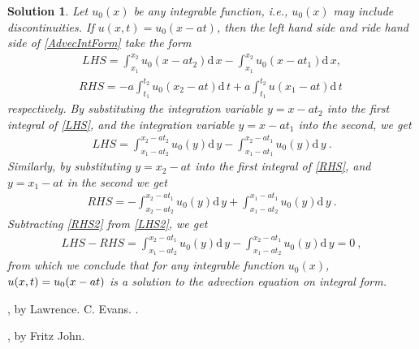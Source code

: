 \documentclass[10pt,letterpaper]{article}
\newcommand{\dif}[1][]{\mathrm{d} {#1}\,}
\newcommand{\frb}[1]{ \left(  {#1} \right) }
\theoremstyle{break}
\newtheorem{mysolution}{Solution}
\newenvironment{solution}{\begin{mysolution}}{\end{mysolution}}
\begin{document}
\begin{solution}
	Let $u_{0}(x)$ be any integrable function, i.e., $u_{0}(x)$ may include discontinuities. If $u(x,t)=u_0(x-at)$, then the left hand side and ride hand side of \eqref{AdvecIntForm} take the form
	\begin{gather} \label{LHS}
		LHS=\int_{x_{1}}^{x_{2}}u_{0}\frb{x-at_{2}}\dif x
				-\int_{x_{1}}^{x_{2}}u_{0}\frb{x-at_{1}} \dif x,
	\end{gather}
	\begin{gather} \label{RHS}
		RHS=-a\int_{t_{1}}^{t_{2}}u_{0}\frb{x_{2}-at}\dif t
				+a\int_{t_{1}}^{t_{2}}u\frb{x_{1}-at}\dif t\ 
	\end{gather}
	respectively. By substituting the integration variable $y=x-at_{2}$ into the first integral of \eqref{LHS}, and the integration variable $y=x-at_{1}$ into the second, we get
	\begin{gather} \label{LHS2}
		LHS=\int_{x_{1}-at_{2}}^{x_{2}-at_{2}}u_{0}\frb{y}\dif y
			-\int_{x_{1}-at_{1}}^{x_{2}-at_{1}}u_{0}\frb{y}\dif y\ .
	\end{gather}
	Similarly, by substituting $y=x_{2}-at$ into the first integral of \eqref{RHS}, and $y=x_{1}-at$ in the second we get 
	\begin{gather} \label{RHS2}
		RHS=- \int_{x_{2}-at_{2}}^{x_{2}-at_{1}}u_{0}\frb{y}\dif y
			+\int_{x_{1}-at_{2}}^{x_{1}-at_{1}}u_{0}\frb{y} \dif y\ .
	\end{gather}
	Subtracting \eqref{RHS2} from \eqref{LHS2}, we get
	\begin{gather}
		LHS-RHS=\int_{x_{1}-at_{2}}^{x_{2}-at_{1}}u_{0}\frb{y} \dif y
			-\int_{x_{1}-at_{2}}^{x_{2}-at_{1}}u_{0}\frb{y} \dif y=0\ ,
	\end{gather}
	from which we conclude that for any integrable function $u_{0}\!\left(x\right)$, $u\!\left(x,t\right)=u_{0}\text{\!}\left(x-at\right)$ is a solution to the advection equation on integral form.
\end{solution}
	



\begin{thebibliography}{----}
	, by Lawrence. C. Evans.
	.
	
	, by Fritz John.	
\end{thebibliography}
\end{document}
